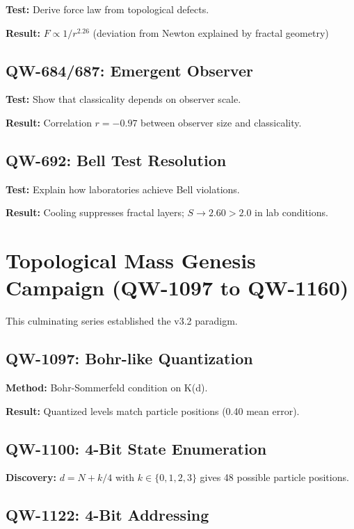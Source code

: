 \documentclass[11pt, a4paper]{article}
\theoremstyle{remark}
\begin{document}
\textbf{Test:} Derive force law from topological defects.

\textbf{Result:} $F \propto 1/r^{2.26}$ (deviation from Newton explained by fractal geometry)

\subsection{QW-684/687: Emergent Observer}

\textbf{Test:} Show that classicality depends on observer scale.

\textbf{Result:} Correlation $r = -0.97$ between observer size and classicality.

\subsection{QW-692: Bell Test Resolution}

\textbf{Test:} Explain how laboratories achieve Bell violations.

\textbf{Result:} Cooling suppresses fractal layers; $S \rightarrow 2.60 > 2.0$ in lab conditions.

\section{Topological Mass Genesis Campaign (QW-1097 to QW-1160)}

This culminating series established the v3.2 paradigm.

\subsection{QW-1097: Bohr-like Quantization}

\textbf{Method:} Bohr-Sommerfeld condition on K(d).

\textbf{Result:} Quantized levels match particle positions (0.40 mean error).

\subsection{QW-1100: 4-Bit State Enumeration}

\textbf{Discovery:} $d = N + k/4$ with $k \in \{0,1,2,3\}$ gives 48 possible particle positions.

\subsection{QW-1122: 4-Bit Addressing}
\end{document}
